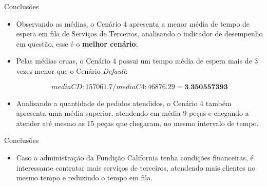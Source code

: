 \documentclass[xcolor=dvipsnames]{beamer}
\let\olditem=\item%
\renewcommand{\item}{\olditem \justifying}%
\begin{document}
\begin{frame}{Conclusões}
	\begin{itemize}
		\item Observando as médias, o Cenário 4 apresenta a menor média de tempo de espera em fila de Serviços de Terceiros, analisando o indicador de desempenho em questão, esse é o \textbf{melhor cenário};
		      			
		      \bigskip
		      			
		\item Pelas médias cruas, o Cenário 4 possui um tempo média de espera mais de 3 vezes menor que o Cenário \textit{Default}: 
		      			
		      \begin{block}{}
		      	$$ mediaCD: 157061.7/ mediaC4: 46876.29 = \textbf{3.350557393} $$
		      \end{block}
		      	
         \medskip
		\item Analisando a quantidade de pedidos atendidos, o Cenário 4 também apresenta uma média superior, atendendo em média 9 peças e chegando a atender até mesmo as 15 peças que chegaram, no mesmo intervalo de tempo.
		      
	\end{itemize}		
\end{frame}
	
\begin{frame}{Conclusões}
	\begin{itemize}
		\begin{block}{Contratar mais serviços de empresas terceirizadas, reduz o tempo de espera na fila de Serviços Terceirizados?}
			Talvez o ato de pagar um pouco mais caro por mais serviços possa gerar mais lucro pelo fato de diminuir o gargalo na fila de espera do serviço de terceiros, levando ao atendimento de mais pedidos;
		\end{block}
					
		\bigskip
					
		\item Caso a administração da Fundição California tenha condições financeiras, é interessante contratar mais serviços de terceiros, atendendo mais clientes no mesmo tempo e reduzindo o tempo em fila.
	\end{itemize}		
\end{frame}

\frame{\titlepage}
\end{document}

